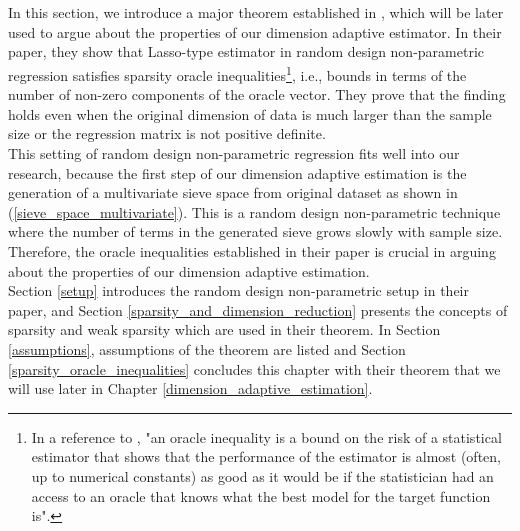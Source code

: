 \documentclass[12pt, a4paper]{article}
\theoremstyle{MAstyle} \newtheorem{assumption}{Assumption}[section]
\theoremstyle{MAstyle} \newtheorem{definition}{Definition}[section]
\theoremstyle{MAstyle} \newtheorem{theorem}{Theorem}[section]
\theoremstyle{MAstyle} \newtheorem{corollary}{Corollary}[section]
\begin{document}
        \newpage
        \section{\cite{Bunea_2007}} \label{bunea_paper}
            In this section, we introduce a major theorem established in \cite{Bunea_2007}, which will be later used to argue about the properties of our dimension adaptive estimator. In their paper, they show that Lasso-type estimator in random design non-parametric regression satisfies sparsity oracle inequalities\footnote{In a reference to \cite{Koltchinskii_2011}, "an oracle inequality is a bound on the risk of a statistical estimator that shows that the performance of the estimator is almost (often, up to numerical constants) as good as it would be if the statistician had an access to an oracle that knows what the best model for the target function is".}, i.e., bounds in terms of the number of non-zero components of the oracle vector. They prove that the finding holds even when the original dimension of data is much larger than the sample size or the regression matrix is not positive definite.\\
            
            This setting of random design non-parametric regression fits well into our research, because the first step of our dimension adaptive estimation is the generation of a multivariate sieve space from original dataset as shown in (\ref{sieve_space_multivariate}). This is a random design non-parametric technique where the number of terms in the generated sieve grows slowly with sample size. Therefore, the oracle inequalities established in their paper is crucial in arguing about the properties of our dimension adaptive estimation.\\

            Section \ref{setup} introduces the random design non-parametric setup in their paper, and Section \ref{sparsity_and_dimension_reduction} presents the concepts of sparsity and weak sparsity which are used in their theorem. In Section \ref{assumptions}, assumptions of the theorem are listed and Section \ref{sparsity_oracle_inequalities} concludes this chapter with their theorem that we will use later in Chapter \ref{dimension_adaptive_estimation}.
            
\end{document}
